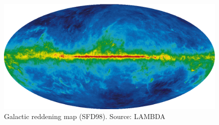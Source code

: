 \begin{figure}[tbp]
	\centering
	\includegraphics[width=\textwidth]{figures/galactic_reddening_ebv_map_sfd98}
	\caption[Galactic reddening map (SFD98)]{Galactic reddening map (SFD98). Source: LAMBDA}
	\label{fig:reddening}
\end{figure}


